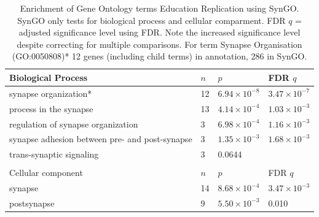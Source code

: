 \begin{table}[]
    \centering
    
    \begin{tabular}{llll}
    \toprule
    Biological Process & $n$ & $p$ & FDR $q$\\
    \midrule
synapse organization*&	12& $6.94\times10^{-8}$	& $3.47\times10^{-7}$\\
process in the synapse&	13&	$4.14\times10^{-4}$&$1.03\times10^{-3}$\\
regulation of synapse organization	&3&	$6.98\times10^{-4}$&	$1.16\times10^{-3}$\\
synapse adhesion between pre- and post-synapse&	3	&$1.35\times10^{-3}$&$1.68\times10^{-3}$\\
trans-synaptic signaling	&3	&0.0644&	\\
\\
\bottomrule
\toprule
 Cellular component & $n$ & $p$ & FDR $q$\\
 \midrule
    synapse&14	&$8.68\times10^{-4}$	&$3.47\times10^{-3}$\\
postsynapse&	9	&$5.50\times10^{-3}$	&0.010       \\
         \bottomrule
\end{tabular}
    \caption[GO enrichment SynGO Education Replication]{Enrichment of Gene Ontology terms Education Replication using SynGO. SynGO only tests for biological process and cellular comparment. FDR $q$ = adjusted significance level using FDR. Note the increased significance level despite correcting for multiple comparisons. For term Synapse Organisation (GO:0050808)* 12 genes (including child terms) in annotation, 286 in SynGO. }
    \label{tab:enrichment of gene ontology terms in syngo}
\end{table}


